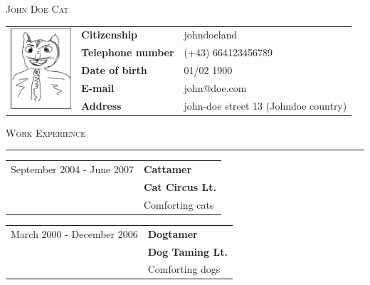 \documentclass[
	fontsize = 10.0pt,
	a4paper,
	parskip = half*,
	twoside,	%
]{scrartcl}
\makeatletter
\renewcommand{\arraystretch}{1.5}			%
\newcommand\CVname{John Doe Cat}
\newcommand\CVcitizenship{johndoeland}
\newcommand\CVphonenumber{(+43) 664123456789}
\newcommand\CVbirthdate{01/02 1900}
\newcommand\CVmail{john@doe.com}
\newcommand\CVaddress{john-doe street 13 (Johndoe country)}
\newcommand{\hlinewidth}{0.5mm}
\newcommand{\hlinelength}{150mm}
\newcommand{\hlinecolor}{black!25}
\newcommand{\hlinevskip}{-4.0mm}
\newcommand{\vskipEntries}{-5.0mm}
\newcommand{\hskipFirstColumn}{5.0cm}
\makeatother
\begin{document}

	{\fontsize{20pt}{17pt}\selectfont\scshape \CVname}

	\begin{table}[H]
		\begin{tabular}{ p{3cm} l l }		%
			\multirow{5}{*}{\includegraphics[height = 3.0cm]{cv_photo}}		&	\textbf{Citizenship}		&	\CVcitizenship	\\
																			&	\textbf{Telephone number}	&	\CVphonenumber	\\
																			&	\textbf{Date of birth}		&	\CVbirthdate	\\
																			&	\textbf{E-mail}				&	\CVmail			\\
																			&	\textbf{Address}			&	\CVaddress		\\
		\end{tabular}
	\end{table}%

	{\fontsize{20pt}{17pt}\selectfont\scshape Work Experience}
	\vskip \hlinevskip%
	\textcolor{\hlinecolor}{\rule{\hlinelength}{\hlinewidth}}

	\renewcommand{\arraystretch}{1.25}			%
	\begin{table}[H]
		\begin{tabular}{ p{\hskipFirstColumn} l }		%
			September 2004 - June 2007		&	{\fontsize{14pt}{10pt}\selectfont\bfseries Cattamer}	\\
											&	\textbf{Cat Circus Lt.}									\\
											&	Comforting cats											\\
		\end{tabular}
	\end{table}%

	\vspace{\vskipEntries}

	\begin{table}[H]
		\begin{tabular}{ p{\hskipFirstColumn} l }		%
			March 2000 - December 2006		&	{\fontsize{14pt}{10pt}\selectfont\bfseries Dogtamer}	\\
											&	\textbf{Dog Taming Lt.}									\\
											&	Comforting dogs											\\
		\end{tabular}
	\end{table}%
\end{document}
